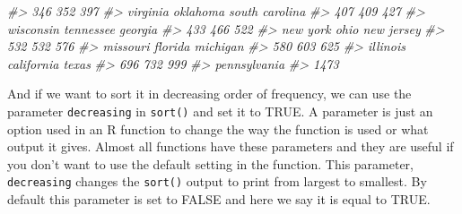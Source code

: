 \documentclass[
  12pt,
]{book}
\newenvironment{Shaded}{\begin{snugshade}}{\end{snugshade}}
\newcommand{\CommentTok}[1]{\textcolor[rgb]{0.37,0.37,0.37}{\textit{#1}}}
\begin{document}
\begin{Shaded}
\begin{Highlighting}[]
\CommentTok{\#>                  346                  352                  397 }
\CommentTok{\#>             virginia             oklahoma       south carolina }
\CommentTok{\#>                  407                  409                  427 }
\CommentTok{\#>            wisconsin            tennessee              georgia }
\CommentTok{\#>                  433                  466                  522 }
\CommentTok{\#>             new york                 ohio           new jersey }
\CommentTok{\#>                  532                  532                  576 }
\CommentTok{\#>             missouri              florida             michigan }
\CommentTok{\#>                  580                  603                  625 }
\CommentTok{\#>             illinois           california                texas }
\CommentTok{\#>                  696                  732                  999 }
\CommentTok{\#>         pennsylvania }
\CommentTok{\#>                 1473}
\end{Highlighting}
\end{Shaded}

And if we want to sort it in decreasing order of frequency, we can use the parameter \texttt{decreasing} in \texttt{sort()} and set it to TRUE. A parameter is just an option used in an R function to change the way the function is used or what output it gives. Almost all functions have these parameters and they are useful if you don't want to use the default setting in the function. This parameter, \texttt{decreasing} changes the \texttt{sort()} output to print from largest to smallest. By default this parameter is set to FALSE and here we say it is equal to TRUE.
\end{document}
